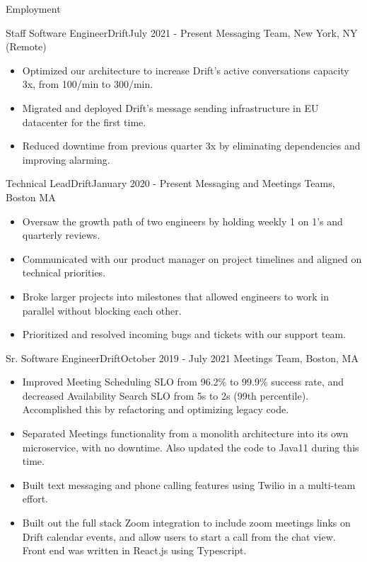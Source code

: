 \documentclass[]{mcdowellcv}
\begin{document}
	\makeheader
	
	\begin{cvsection}{Employment}
		\begin{cvsubsection}{Staff Software Engineer}{Drift}{July 2021 - Present}
			Messaging Team, New York, NY (Remote)
			\begin{itemize}
				\item Optimized our architecture to increase Drift's active conversations capacity 3x, from 100/min to 300/min.
				\item Migrated and deployed Drift's message sending infrastructure in EU datacenter for the first time.
				\item Reduced downtime from previous quarter  3x by eliminating dependencies and improving alarming.
			\end{itemize}
		\end{cvsubsection}
		\begin{cvsubsection}{Technical Lead}{Drift}{January 2020 - Present}
			Messaging and Meetings Teams, Boston MA
			\begin{itemize}
				\item Oversaw the growth path of two engineers by holding weekly 1 on 1's and quarterly reviews.
				\item Communicated with our product manager on project timelines and aligned on technical priorities.
				\item Broke larger projects into milestones that allowed engineers to work in parallel without blocking each other.
				\item Prioritized and resolved incoming bugs and tickets with our support team.
			\end{itemize}
		\end{cvsubsection}
		\begin{cvsubsection}{Sr. Software Engineer}{Drift}{October 2019 - July 2021}	
			Meetings Team, Boston, MA	
			\begin{itemize}
				\item Improved Meeting Scheduling SLO from 96.2\% to 99.9\% success rate, and decreased Availability Search SLO from 5s to 2s (99th percentile).  Accomplished this by refactoring and optimizing legacy code.
				\item Separated Meetings functionality from a monolith architecture into its own microservice, with no downtime.  Also updated the code to Java11 during this time.
				\item Built text messaging and phone calling features using Twilio in a multi-team effort.   
				\item Built out the full stack Zoom integration to include zoom meetings links on Drift calendar events, and allow users to start a call from the chat view.  Front end was written in React.js using Typescript.
			\end{itemize}
		\end{cvsubsection}
		

\end{cvsection}
\end{document}
